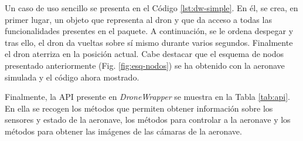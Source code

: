 \documentclass[../main.tex]{subfiles}
\begin{document}
Un caso de uso sencillo se presenta en el Código \ref{lst:dw-simple}. En él, se crea, en primer lugar, un objeto que representa al dron y que da acceso a todas las funcionalidades presentes en el paquete. A continuación, se le ordena despegar y tras ello, el dron da vueltas sobre sí mismo durante varios segundos. Finalmente el dron aterriza en la posición actual. Cabe destacar que el esquema de nodos presentado anteriormente (Fig. \ref{fig:esq-nodos}) se ha obtenido con la aeronave simulada y el código ahora mostrado.

Finalmente, la API presente en \emph{DroneWrapper} se muestra en la Tabla \ref{tab:api}. En ella se recogen los métodos que permiten obtener información sobre los sensores y estado de la aeronave, los métodos para controlar a la aeronave y los métodos para obtener las imágenes de las cámaras de la aeronave.
\end{document}
